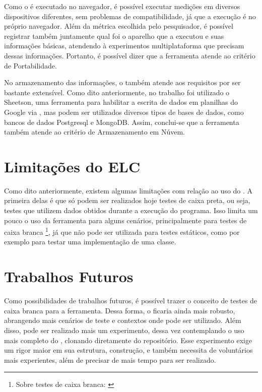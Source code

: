 \documentclass[12pt]{tcc}
\begin{document}
	Como o  é executado no navegador, é possível executar medições em diversos dispositivos diferentes, sem problemas de compatibilidade, já que a execução é no próprio navegador. Além da métrica escolhida pelo pesquisador, é possível registrar também juntamente qual foi o aparelho que a executou e suas informações básicas, atendendo à experimentos multiplataforma que precisam dessas informações. Portanto, é possível dizer que a ferramenta atende ao critério de Portabilidade.

	No armazenamento das informações, o  também atende aos requisitos por ser bastante extensível. Como dito anteriormente, no trabalho foi utilizado o Sheetson, uma ferramenta para habilitar a escrita de dados em planilhas do Google via , mas podem ser utilizados diversos tipos de bases de dados, como bancos de dados Postgresql e MongoDB. Assim, conclui-se que a ferramenta também atende ao critério de Armazenamento em Núvem.


	\section{Limitações do ELC}
	\label{section:limitacoes-elc}

	Como dito anteriormente, existem algumas limitações com relação ao uso do . A primeira delas é que só podem ser realizados hoje testes de caixa preta, ou seja, testes que utilizem dados obtidos durante a execução do programa. Isso limita um pouco o uso da ferramenta para alguns cenários, principalmente para testes de caixa branca \footnote{Sobre testes de caixa branca: \citep[Capítulo 21]{Sommerville2015Software}}, já que não pode ser utilizada para testes estáticos, como por exemplo para testar uma implementação de uma classe.

	\section{Trabalhos Futuros}
	\label{section:trabalhos-futuros}

	Como possibilidades de trabalhos futuros, é possível trazer o conceito de testes de caixa branca para a ferramenta. Dessa forma, o  ficaria ainda mais robusto, abrangendo mais cenários de teste e contextos onde pode ser utilizado. Além disso, pode ser realizado mais um experimento, dessa vez contemplando o uso mais completo do , clonando diretamente do repositório. Esse experimento exige um rigor maior em sua estrutura, construção, e também necessita de voluntários mais experientes, além de precisar de mais tempo para ser realizado.
\end{document}
